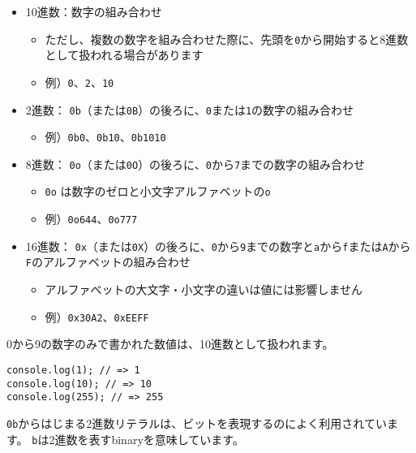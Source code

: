 \begin{itemize}
\item
  10進数：数字の組み合わせ

  \begin{itemize}
  \item
    ただし、複数の数字を組み合わせた際に、先頭を\texttt{0}から開始すると8進数として扱われる場合があります
  \item
    例）\texttt{0}、\texttt{2}、\texttt{10}
  \end{itemize}
\item
  2進数：
  \texttt{0b}（または\texttt{0B}）の後ろに、\texttt{0}または\texttt{1}の数字の組み合わせ

  \begin{itemize}
  \item
    例）\texttt{0b0}、\texttt{0b10}、\texttt{0b1010}
  \end{itemize}
\item
  8進数：
  \texttt{0o}（または\texttt{0O}）の後ろに、\texttt{0}から\texttt{7}までの数字の組み合わせ

  \begin{itemize}
  \item
    \texttt{0o}
    は数字のゼロと小文字アルファベットの\texttt{o}
  \item
    例）\texttt{0o644}、\texttt{0o777}
  \end{itemize}
\item
  16進数：
  \texttt{0x}（または\texttt{0X}）の後ろに、\texttt{0}から\texttt{9}までの数字と\texttt{a}から\texttt{f}または\texttt{A}から\texttt{F}のアルファベットの組み合わせ

  \begin{itemize}
  \item
    アルファベットの大文字・小文字の違いは値には影響しません
  \item
    例）\texttt{0x30A2}、\texttt{0xEEFF}
  \end{itemize}
\end{itemize}

0から9の数字のみで書かれた数値は、10進数として扱われます。

\begin{lstlisting}
console.log(1); // => 1
console.log(10); // => 10
console.log(255); // => 255
\end{lstlisting}

\texttt{0b}からはじまる2進数リテラルは、ビットを表現するのによく利用されています。
\texttt{b}は2進数を表すbinaryを意味しています。

